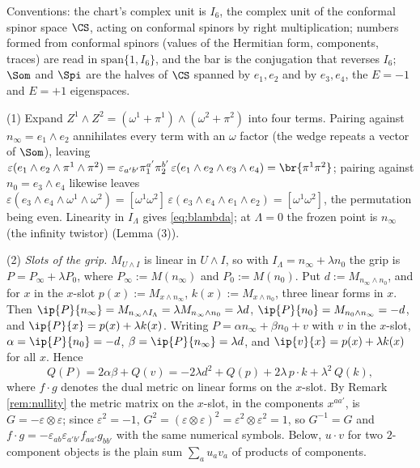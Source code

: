 Conventions: the chart's complex unit is $I_{6}$, the complex unit of the conformal spinor space $\CS$, acting on conformal spinors by right multiplication; numbers formed from conformal spinors (values of the Hermitian form, components, traces) are read in $\mathrm{span}\{1, I_{6}\}$, and the bar is the conjugation that reverses $I_{6}$; $\Som$ and $\Spi$ are the halves of $\CS$ spanned by $e_{1}, e_{2}$ and by $e_{3}, e_{4}$, the $E = -1$ and $E = +1$ eigenspaces.

(1) Expand $Z^{1}\wedge Z^{2} = (\omega^{1} + \pi^{1})\wedge(\omega^{2} + \pi^{2})$ into four terms. Pairing against $n_{\infty} = e_{1}\wedge e_{2}$ annihilates every term with an $\omega$ factor (the wedge repeats a vector of $\Som$), leaving $\varepsilon(e_{1}\wedge e_{2}\wedge\pi^{1}\wedge\pi^{2}) = \varepsilon_{a'b'}\pi_{1}^{a'}\pi_{2}^{b'}\,\varepsilon(e_{1}\wedge e_{2}\wedge e_{3}\wedge e_{4}) = \br{\pi^{1}\pi^{2}}$; pairing against $n_{0} = e_{3}\wedge e_{4}$ likewise leaves $\varepsilon(e_{3}\wedge e_{4}\wedge\omega^{1}\wedge\omega^{2}) = [\omega^{1}\omega^{2}]\,\varepsilon(e_{3}\wedge e_{4}\wedge e_{1}\wedge e_{2}) = [\omega^{1}\omega^{2}]$, the permutation being even. Linearity in $I_{\Lambda}$ gives \eqref{eq:blambda}; at $\Lambda = 0$ the frozen point is $n_{\infty}$ (the infinity twistor) (Lemma (3)).

(2) \emph{Slots of the grip.} $M_{U\wedge I}$ is linear in $U \wedge I$, so with $I_{\Lambda} = n_{\infty} + \lambda n_{0}$ the grip is $P = P_{\infty} + \lambda P_{0}$, where $P_{\infty} := M(n_{\infty})$ and $P_{0} := M(n_{0})$. Put $d := M_{n_{\infty}\wedge n_{0}}$, and for $x$ in the $x$-slot $p(x) := M_{x\wedge n_{\infty}}$, $k(x) := M_{x\wedge n_{0}}$, three linear forms in $x$. Then $\ip{P}{n_{\infty}} = M_{n_{\infty}\wedge I_{\Lambda}} = \lambda M_{n_{\infty}\wedge n_{0}} = \lambda d$, $\ip{P}{n_{0}} = M_{n_{0}\wedge n_{\infty}} = -d$, and $\ip{P}{x} = p(x) + \lambda k(x)$. Writing $P = \alpha n_{\infty} + \beta n_{0} + v$ with $v$ in the $x$-slot, $\alpha = \ip{P}{n_{0}} = -d$, $\beta = \ip{P}{n_{\infty}} = \lambda d$, and $\ip{v}{x} = p(x) + \lambda k(x)$ for all $x$. Hence
\[
Q(P) = 2\alpha\beta + Q(v) = -2\lambda d^{2} + Q(p) + 2\lambda\, p\cdot k + \lambda^{2}\, Q(k),
\]
where $f \cdot g$ denotes the dual metric on linear forms on the $x$-slot. By Remark \ref{rem:nullity} the metric matrix on the $x$-slot, in the components $x^{aa'}$, is $G = -\varepsilon\otimes\varepsilon$; since $\varepsilon^{2} = -1$, $G^{2} = (\varepsilon\otimes\varepsilon)^{2} = \varepsilon^{2}\otimes\varepsilon^{2} = 1$, so $G^{-1} = G$ and $f\cdot g = -\varepsilon_{ab}\varepsilon_{a'b'}f_{aa'}g_{bb'}$ with the same numerical symbols. Below, $u\cdot v$ for two $2$-component objects is the plain sum $\sum_{a}u_{a}v_{a}$ of products of components.

